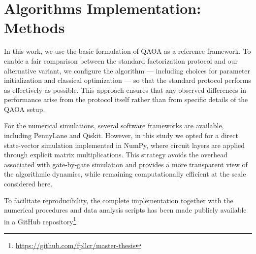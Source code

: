 
\section{Algorithms Implementation: Methods}
\label{Section:Methods}

In this work, we use the basic formulation of QAOA as a reference framework. To enable a fair comparison between the standard factorization protocol and our alternative variant, we configure the algorithm --- including choices for parameter initialization and classical optimization --- so that the standard protocol performs as effectively as possible. This approach ensures that any observed differences in performance arise from the protocol itself rather than from specific details of the QAOA setup.

For the numerical simulations, several software frameworks are available, including PennyLane and Qiskit. However, in this study we opted for a direct state-vector simulation implemented in NumPy, where circuit layers are applied through explicit matrix multiplications. This strategy avoids the overhead associated with gate-by-gate simulation and provides a more transparent view of the algorithmic dynamics, while remaining computationally efficient at the scale considered here.

To facilitate reproducibility, the complete implementation together with the numerical procedures and data analysis scripts has been made publicly available in a GitHub repository\footnote{\url{https://github.com/fpllcr/master-thesis}}.
